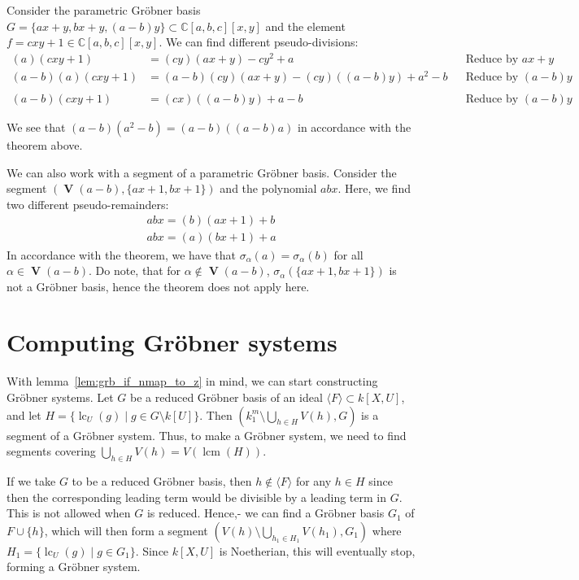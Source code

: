 \documentclass[a4paper, 12pt]{article}
\newcommand{\C}{\mathbb{C}}
\DeclareMathOperator{\LC}{lc}
\DeclareMathOperator{\lcm}{lcm}
\DeclareMathOperator{\V}{\mathbf V}
\theoremstyle{changedot}
\theoremstyle{changedotbreak}
\theoremstyle{nonumberplain}
\begin{document}
\begin{example}\upshape
  Consider the parametric Gröbner basis $G = \{ ax + y, bx + y, (a - b)y \} \subset \C[a, b, c][x, y]$ and the element $f = cxy + 1 \in \C[a, b, c][x, y]$. We can find different pseudo-divisions:
  \begin{align*}
    (a)(cxy + 1) &= (cy)(ax + y) - cy^{2} + a  && \text{Reduce by $ax + y$} \\
    (a-b)(a)(cxy + 1) &= (a-b)(cy)(ax + y) - (cy)((a - b)y) + a^{2} - b && \text{Reduce by $(a - b)y$} \\
    & && \\
    (a-b)(cxy + 1) &= (cx)((a-b)y) + a - b && \text{Reduce by $(a - b)y$}
  \end{align*}

  We see that $(a-b)(a^{2} - b) = (a - b)((a-b)a)$ in accordance with the theorem above.

  We can also work with a segment of a parametric Gröbner basis. Consider the segment $(\V(a - b), \{ax + 1, bx + 1\})$ and the polynomial $abx$. Here, we find two different pseudo-remainders:
  \begin{align*}
    abx = (b)(ax + 1) + b \\
    abx = (a)(bx + 1) + a
  \end{align*}
  In accordance with the theorem, we have that $\sigma_{\alpha}(a) = \sigma_{\alpha}(b)$ for all $\alpha \in \V(a - b)$. Do note, that for $\alpha \notin \V(a - b)$, $\sigma_{\alpha}(\{ax + 1, bx + 1\})$ is not a Gröbner basis, hence the theorem does not apply here.
\end{example}





\section{Computing Gröbner systems}

With lemma~\ref{lem:grb_if_nmap_to_z} in mind, we can start constructing Gröbner systems. Let $G$ be a reduced Gröbner basis of an ideal $\langle F \rangle \subset k[X, U]$, and let $H = \{\LC_{U}(g) \mid g \in G \setminus k[U]\}$. Then $\left(k_{1}^{m} \setminus \bigcup_{h \in H} V(h), G\right)$ is a segment of a Gröbner system. Thus, to make a Gröbner system, we need to find segments covering $\bigcup_{h \in H} V(h) = V(\lcm(H))$.

If we take $G$ to be a reduced Gröbner basis, then $h \notin \langle F \rangle$ for any $h \in H$ since then the corresponding leading term would be divisible by a leading term in $G$. This is not allowed when $G$ is reduced. Hence,- we can find a Gröbner basis $G_{1}$ of $F \cup \{h\}$, which will then form a segment $(V(h) \setminus \bigcup_{h_{1} \in H_{1}} V(h_{1}), G_{1})$ where $H_{1} = \{\LC_{U}(g) \mid g \in G_{1}\}$. Since $k[X, U]$ is Noetherian, this will eventually stop, forming a Gröbner system.
\end{document}
